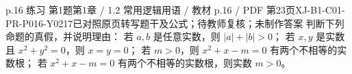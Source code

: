 \par\noindent\begin{minipage}{\linewidth}
\begin{bankitem}{p.16 练习 第1题}{第1章 / 1.2 常用逻辑用语 / 教材 p.16 / PDF 第23页}{XJ-B1-C01-PR-P016-Y0217}{已对照原页转写题干及公式；待教师复核；未制作答案}
判断下列命题的真假，并说明理由：
若 $a,b$ 是任意实数，则 $|a|+|b|>0$；
若 $x,y$ 是实数且 $x^2+y^2=0$，则 $x=y=0$；
若 $m>0$，则 $x^2+x-m=0$ 有两个不相等的实数根；
若 $x^2+x-m=0$ 有两个不相等的实数根，则实数 $m>0$。
\end{bankitem}
\end{minipage}\par\medskip
